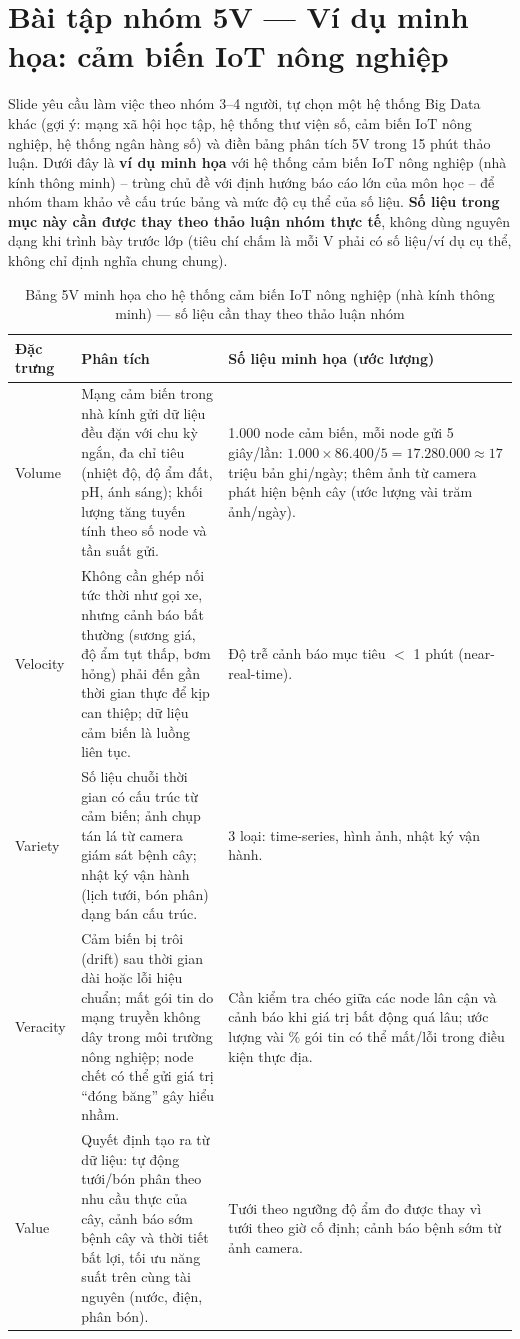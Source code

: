 \documentclass[12pt,a4paper,oneside]{article}
\begin{document}
\section{Bài tập nhóm 5V --- Ví dụ minh họa: cảm biến IoT nông nghiệp}
\label{sec:5v-bainhom}

Slide yêu cầu làm việc theo nhóm 3--4 người, tự chọn một hệ thống Big Data khác (gợi ý: mạng xã hội học tập, hệ thống thư viện số, cảm biến IoT nông nghiệp, hệ thống ngân hàng số) và điền bảng phân tích 5V trong 15 phút thảo luận. Dưới đây là \textbf{ví dụ minh họa} với hệ thống cảm biến IoT nông nghiệp (nhà kính thông minh) -- trùng chủ đề với định hướng báo cáo lớn của môn học -- để nhóm tham khảo về cấu trúc bảng và mức độ cụ thể của số liệu. \textbf{Số liệu trong mục này cần được thay theo thảo luận nhóm thực tế}, không dùng nguyên dạng khi trình bày trước lớp (tiêu chí chấm là mỗi V phải có số liệu/ví dụ cụ thể, không chỉ định nghĩa chung chung).

\begin{table}[H]
\centering
\caption{Bảng 5V minh họa cho hệ thống cảm biến IoT nông nghiệp (nhà kính thông minh) --- số liệu cần thay theo thảo luận nhóm}
\label{tab:5v-iot}
\begin{tabularx}{\textwidth}{l X X}
\toprule
Đặc trưng & Phân tích & Số liệu minh họa (ước lượng) \\
\midrule
Volume & Mạng cảm biến trong nhà kính gửi dữ liệu đều đặn với chu kỳ ngắn, đa chỉ tiêu (nhiệt độ, độ ẩm đất, pH, ánh sáng); khối lượng tăng tuyến tính theo số node và tần suất gửi. & 1.000 node cảm biến, mỗi node gửi 5 giây/lần: $1.000 \times 86.400 / 5 = 17.280.000 \approx 17$ triệu bản ghi/ngày; thêm ảnh từ camera phát hiện bệnh cây (ước lượng vài trăm ảnh/ngày). \\
Velocity & Không cần ghép nối tức thời như gọi xe, nhưng cảnh báo bất thường (sương giá, độ ẩm tụt thấp, bơm hỏng) phải đến gần thời gian thực để kịp can thiệp; dữ liệu cảm biến là luồng liên tục. & Độ trễ cảnh báo mục tiêu $<$ 1 phút (near-real-time). \\
Variety & Số liệu chuỗi thời gian có cấu trúc từ cảm biến; ảnh chụp tán lá từ camera giám sát bệnh cây; nhật ký vận hành (lịch tưới, bón phân) dạng bán cấu trúc. & 3 loại: time-series, hình ảnh, nhật ký vận hành. \\
Veracity & Cảm biến bị trôi (drift) sau thời gian dài hoặc lỗi hiệu chuẩn; mất gói tin do mạng truyền không dây trong môi trường nông nghiệp; node chết có thể gửi giá trị ``đóng băng'' gây hiểu nhầm. & Cần kiểm tra chéo giữa các node lân cận và cảnh báo khi giá trị bất động quá lâu; ước lượng vài \% gói tin có thể mất/lỗi trong điều kiện thực địa. \\
Value & Quyết định tạo ra từ dữ liệu: tự động tưới/bón phân theo nhu cầu thực của cây, cảnh báo sớm bệnh cây và thời tiết bất lợi, tối ưu năng suất trên cùng tài nguyên (nước, điện, phân bón). & Tưới theo ngưỡng độ ẩm đo được thay vì tưới theo giờ cố định; cảnh báo bệnh sớm từ ảnh camera. \\
\bottomrule
\end{tabularx}
\end{table}
\end{document}
